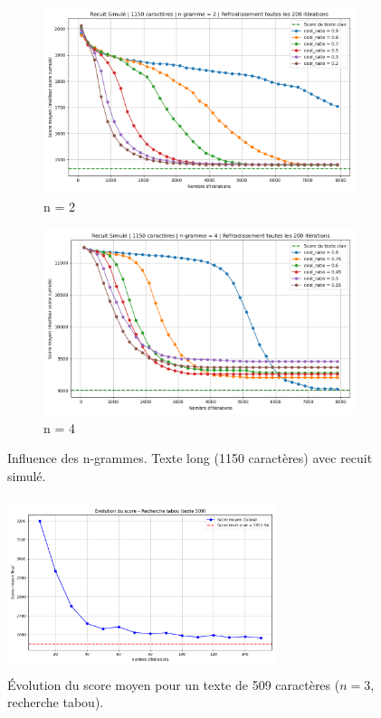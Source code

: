 \documentclass[a4paper]{article}
\begin{document}
\begin{figure}[H]
    \centering
    \begin{subfigure}[b]{0.49\textwidth}
        \includegraphics[width=\textwidth]{graphe_recuit_n_2_1150_cool_time_200.png}
        \caption{n = 2}
        \label{fig:n2-1150-200}
    \end{subfigure}
    \hfill
    \begin{subfigure}[b]{0.49\textwidth}
        \includegraphics[width=\textwidth]{graphe_recuit_n_4_1150_cool_time_200.png}
        \caption{n = 4}
        \label{fig:n4-1150-200}
    \end{subfigure}
    \caption{Influence des n-grammes. Texte long (1150 caractères) avec recuit simulé.}
    \label{fig:rs-n2-n4-1150}
\end{figure}

\begin{figure}[H]
    \centering
    \includegraphics[width=0.7\textwidth, height=5.1cm]{courbe_tabou_509.png}
    \caption{Évolution du score moyen pour un texte de 509 caractères ($n = 3$, recherche tabou).}
    \label{annexe:tabou_500}
\end{figure}
\end{document}
